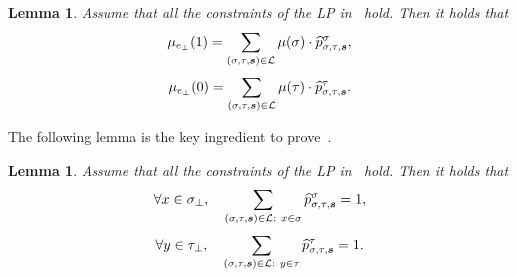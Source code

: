 \documentclass[11pt]{article}
\newtheorem{lemma}[theorem]{Lemma}
\newcommand{\seqS}{\boldsymbol{s}}
\begin{document}
\begin{lemma} \label{lem:ratio-identity}
     Assume that all the constraints of the LP in~ hold. Then it holds that
    \begin{align*}
        \mu_{e_{\bot}}(1) = \sum_{(\sigma, \tau, \seqS) \in \+L}\mu(\sigma)\cdot\widehat{p}_{\sigma, \tau, \seqS}^{\sigma},
    \end{align*}
    \begin{align*}
        \mu_{e_{\bot}}(0)  = \sum_{(\sigma, \tau, \seqS) \in \+L}\mu(\tau)\cdot\widehat{p}_{\sigma, \tau, \seqS}^{\tau}.
    \end{align*}
\end{lemma}

The following lemma is the key ingredient to prove~.

\begin{lemma} \label{lem:ratio-identity-partial}
 Assume that all the constraints of the LP in~ hold. Then it holds that
    \begin{align}\label{eqn-sum-leftside}
        \forall x\in \sigma_\bot, \quad \sum_{(\sigma,\tau, \seqS)\in \+L: \ x\in \sigma} \widehat{p}^{\sigma}_{\sigma,\tau,\seqS}=1,
    \end{align}
    \begin{align}\label{eqn-sum-rightside}
        \forall y\in \tau_\bot, \quad \sum_{(\sigma,\tau, \seqS)\in \+L: \ y\in \tau} \widehat{p}^{\tau}_{\sigma,\tau, \seqS}=1.
    \end{align}
\end{lemma}
\end{document}
